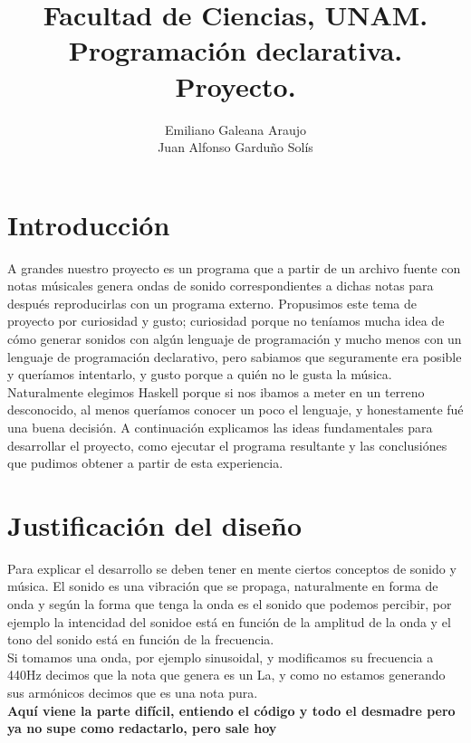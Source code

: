 \documentclass[10pt,a4paper]{article}
\title{Facultad de Ciencias, UNAM.\\Programación declarativa.\\ Proyecto.}
\author{Emiliano Galeana Araujo\\ Juan Alfonso Garduño Solís}
\date{}
\begin{document}
\maketitle
\section{Introducción}
\noindent A grandes nuestro proyecto es un programa que a partir de un archivo fuente con notas músicales genera ondas de sonido correspondientes a  dichas notas  para después reproducirlas con un programa externo. Propusimos este tema de proyecto por curiosidad y gusto; curiosidad porque no teníamos mucha idea de cómo generar sonidos con algún lenguaje de programación y mucho menos con un lenguaje de programación declarativo, pero sabiamos que seguramente era posible y queríamos intentarlo, y gusto porque a quién no le gusta la música. Naturalmente elegimos Haskell porque si nos ibamos a meter en un terreno desconocido, al menos queríamos conocer un poco el lenguaje, y honestamente fué una buena decisión. A continuación explicamos las ideas fundamentales para desarrollar el proyecto, como ejecutar el programa resultante y las conclusiónes que pudimos obtener a partir de esta experiencia. \\

\section{Justificación del diseño}
\noindent Para explicar el desarrollo se deben tener en mente ciertos conceptos de sonido y música. El sonido es una vibración que se propaga, naturalmente en forma de onda y según la forma que tenga la onda es el sonido que podemos percibir, por ejemplo la intencidad del sonidoe está en función de la amplitud de la onda y el tono del sonido está en función de la frecuencia. \\
Si tomamos una onda, por ejemplo sinusoidal, y modificamos su frecuencia a 440Hz decimos que la nota que genera es un La, y como no estamos generando sus armónicos decimos que es una nota pura.\\
\textbf{Aquí viene la parte difícil, entiendo el código y todo el desmadre pero ya no supe como redactarlo, pero sale hoy}
\end{document}
